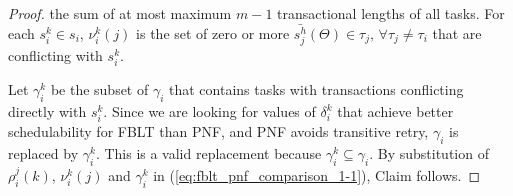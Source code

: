 \documentclass[conference]{IEEEtran}
\newtheorem{clm}{Claim}
\begin{document}
\begin{proof}
the sum of at most maximum $m-1$ transactional lengths of all tasks. For each $s_{i}^{k}\in s_{i}$, $\nu_{i}^{k}(j)$ is the set of zero or more $\bar{s_{j}^{h}}(\Theta)\in\tau_{j},\,\forall\tau_{j}\ne\tau_{i}$
that are conflicting with $s_{i}^{k}$. 
\begin{comment}
The last condition $\bar{s_{j}^{h}}(\Theta)\not\in\nu_{i}^{l},\, l\ne k$
in the definition of $\nu_{i}^{k}(j)$ ensures that common transactions
$\bar{s_{j}^{h}}$ that can conflict with more than one transaction
$s_{i}^{k}\in\tau_{i}$ are split among different $\nu_{i}^{k}(j),\, k=1,..,|s_{i}|$.
This condition is necessary, because in PNF, no two or more transactions of $\tau_{i}^{x}$ can be aborted by the same transaction of $\tau_{j}^{h}$.
\end{comment} 
%
Let $\gamma_{i}^{k}$ be the subset of $\gamma_{i}$ that contains tasks with transactions conflicting directly with $s_{i}^{k}$. 
%
Since we are looking for values of $\delta_i^k$ that achieve better schedulability for FBLT than PNF, and PNF avoids transitive retry, $\gamma_i$ is replaced by $\gamma_i^k$. This is a valid replacement because $\gamma_i^k \subseteq \gamma_i$. 
%
By substitution of $\rho_i^j (k)$, $\nu_i^k(j)$ and $\gamma_i^k$ in (\ref{eq:fblt_pnf_comparison_1-1}), 
Claim follows.
\end{proof}
%
\begin{comment}
\subsection{FBLT vs. Lock-free}
\label{sec:fblt vs lock free}

\begin{clm}\label{clm:fblt_edf_lock-free}
Under G-EDF and G-RMA, the schedulability of FBLT is equal or better than
that under lock-free synchronization if $s_{max}\le r_{max}$. If transactions execute in FIFO
order (i.e., $\delta_{i}^{k}=0,\,\forall s_{i}^{k}$) and contention
is high, $s_{max}$ can be much larger than $r_{max}$.
\end{clm}
\end{comment}
%
\end{document}
